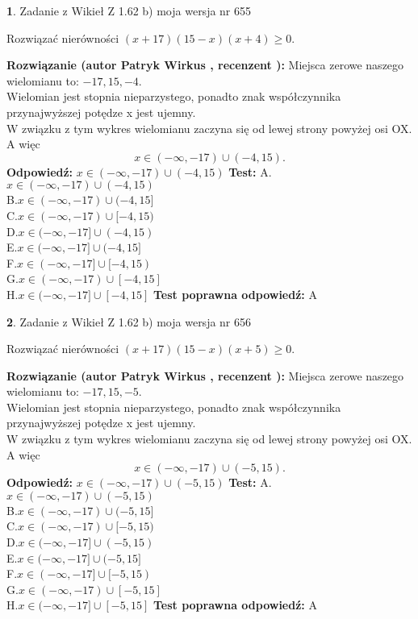 \documentclass[12pt, a4paper]{article}
\theoremstyle{definition} %
\newtheorem{zad}{}
\newcommand{\zadStart}[1]{\begin{zad}#1\newline}
\newcommand{\zadStop}{\end{zad}}
\newcommand{\rozwStart}[2]{\noindent \textbf{Rozwiązanie (autor #1 , recenzent #2): }\newline}
\newcommand{\rozwStop}{\newline}
\newcommand{\odpStart}{\noindent \textbf{Odpowiedź:}\newline}
\newcommand{\odpStop}{\newline}
\newcommand{\testStart}{\noindent \textbf{Test:}\newline}
\newcommand{\testStop}{\newline}
\newcommand{\kluczStart}{\noindent \textbf{Test poprawna odpowiedź:}\newline}
\newcommand{\kluczStop}{\newline}
\begin{document}
\zadStart{Zadanie z Wikieł Z 1.62 b) moja wersja nr 655}

Rozwiązać nierówności $(x+17)(15-x)(x+4)\ge0$.
\zadStop
\rozwStart{Patryk Wirkus}{}
Miejsca zerowe naszego wielomianu to: $-17, 15, -4$.\\
Wielomian jest stopnia nieparzystego, ponadto znak współczynnika przy\linebreak najwyższej potędze x jest ujemny.\\ W związku z tym wykres wielomianu zaczyna się od lewej strony powyżej osi OX. A więc $$x \in (-\infty,-17) \cup (-4,15).$$
\rozwStop
\odpStart
$x \in (-\infty,-17) \cup (-4,15)$
\odpStop
\testStart
A.$x \in (-\infty,-17) \cup (-4,15)$\\
B.$x \in (-\infty,-17) \cup (-4,15]$\\
C.$x \in (-\infty,-17) \cup [-4,15)$\\
D.$x \in (-\infty,-17] \cup (-4,15)$\\
E.$x \in (-\infty,-17] \cup (-4,15]$\\
F.$x \in (-\infty,-17] \cup [-4,15)$\\
G.$x \in (-\infty,-17) \cup [-4,15]$\\
H.$x \in (-\infty,-17] \cup [-4,15]$
\testStop
\kluczStart
A
\kluczStop



\zadStart{Zadanie z Wikieł Z 1.62 b) moja wersja nr 656}

Rozwiązać nierówności $(x+17)(15-x)(x+5)\ge0$.
\zadStop
\rozwStart{Patryk Wirkus}{}
Miejsca zerowe naszego wielomianu to: $-17, 15, -5$.\\
Wielomian jest stopnia nieparzystego, ponadto znak współczynnika przy\linebreak najwyższej potędze x jest ujemny.\\ W związku z tym wykres wielomianu zaczyna się od lewej strony powyżej osi OX. A więc $$x \in (-\infty,-17) \cup (-5,15).$$
\rozwStop
\odpStart
$x \in (-\infty,-17) \cup (-5,15)$
\odpStop
\testStart
A.$x \in (-\infty,-17) \cup (-5,15)$\\
B.$x \in (-\infty,-17) \cup (-5,15]$\\
C.$x \in (-\infty,-17) \cup [-5,15)$\\
D.$x \in (-\infty,-17] \cup (-5,15)$\\
E.$x \in (-\infty,-17] \cup (-5,15]$\\
F.$x \in (-\infty,-17] \cup [-5,15)$\\
G.$x \in (-\infty,-17) \cup [-5,15]$\\
H.$x \in (-\infty,-17] \cup [-5,15]$
\testStop
\kluczStart
A
\kluczStop
\end{document}
